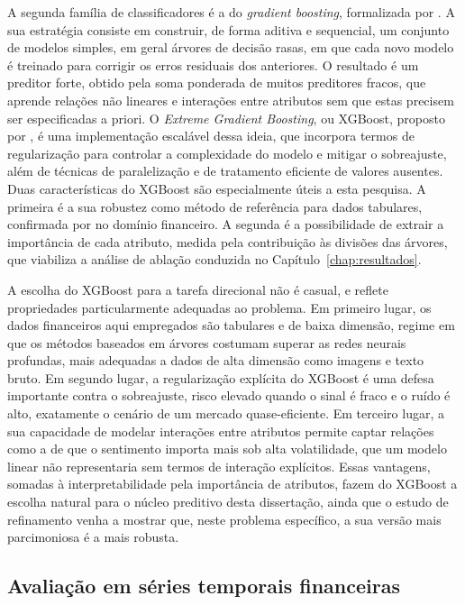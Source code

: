 A segunda família de classificadores é a do \textit{gradient boosting}, formalizada por . A sua estratégia consiste em construir, de forma aditiva e sequencial, um conjunto de modelos simples, em geral árvores de decisão rasas, em que cada novo modelo é treinado para corrigir os erros residuais dos anteriores. O resultado é um preditor forte, obtido pela soma ponderada de muitos preditores fracos, que aprende relações não lineares e interações entre atributos sem que estas precisem ser especificadas a priori. O \textit{Extreme Gradient Boosting}, ou XGBoost, proposto por , é uma implementação escalável dessa ideia, que incorpora termos de regularização para controlar a complexidade do modelo e mitigar o sobreajuste, além de técnicas de paralelização e de tratamento eficiente de valores ausentes. Duas características do XGBoost são especialmente úteis a esta pesquisa. A primeira é a sua robustez como método de referência para dados tabulares, confirmada por  no domínio financeiro. A segunda é a possibilidade de extrair a importância de cada atributo, medida pela contribuição às divisões das árvores, que viabiliza a análise de ablação conduzida no Capítulo~\ref{chap:resultados}.

A escolha do XGBoost para a tarefa direcional não é casual, e reflete propriedades particularmente adequadas ao problema. Em primeiro lugar, os dados financeiros aqui empregados são tabulares e de baixa dimensão, regime em que os métodos baseados em árvores costumam superar as redes neurais profundas, mais adequadas a dados de alta dimensão como imagens e texto bruto. Em segundo lugar, a regularização explícita do XGBoost é uma defesa importante contra o sobreajuste, risco elevado quando o sinal é fraco e o ruído é alto, exatamente o cenário de um mercado quase-eficiente. Em terceiro lugar, a sua capacidade de modelar interações entre atributos permite captar relações como a de que o sentimento importa mais sob alta volatilidade, que um modelo linear não representaria sem termos de interação explícitos. Essas vantagens, somadas à interpretabilidade pela importância de atributos, fazem do XGBoost a escolha natural para o núcleo preditivo desta dissertação, ainda que o estudo de refinamento venha a mostrar que, neste problema específico, a sua versão mais parcimoniosa é a mais robusta.

\subsection{Avaliação em séries temporais financeiras}

